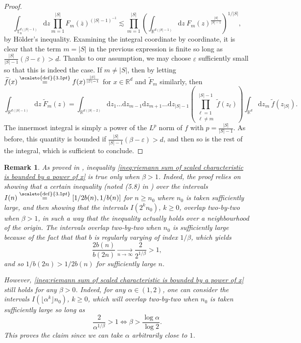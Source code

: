 \documentclass[12pt]{article}
\newcommand{\RR}{\mathbb R}
\newcommand{\TT}{\mathbb T}
\newcommand{\1}{\mathds{1}}
\renewcommand{\d}{\mathrm d}
\newcommand{\eqdef}{\stackrel{\scaleto{\mathrm{def}}{3.5pt}}{=}}
\newtheorem*{remark}{Remark}
\numberwithin{equation}{section}
\begin{document}
\begin{proof}
    \begin{equation*}
        \int_{\TT_n^{d(|S|-1)}}\d z\prod_{m=1}^{|S|}F_m(\overline z)^{(|S|-1)^{-1}}\lesssim \prod_{m=1}^{|S|}\left(\int_{\RR^{d(|S|-1)}}\d z \ F_m(z)^{\frac{|S|}{|S|-1}}\right)^{1/|S|},
    \end{equation*}
    by Hölder's inequality.
    Examining the integral coordinate by coordinate, it is clear that the term $m=|S|$ in the previous expression is finite so long as $\frac{|S|}{|S|-1}(\beta-\varepsilon)>d$. Thanks to our assumption, we may choose $\varepsilon$ sufficiently small so that this is indeed the case. If $m\ne|S|$, then by letting $\widetilde f(x)\eqdef f(x)^{\frac{|S|}{|S|-1}}$ for $x\in\RR^d$ and $\widetilde F_m$ similarly, then
    \begin{equation*}
        \int_{\RR^{d(|S|-1)}}\d z\ \widetilde F_m(z)=\int_{\RR^{d(|S|-2)}}\d z_1\dots\d z_{m-1}\d z_{m+1}\dots\d z_{|S|-1}\left(\prod_{\substack{\ell=1 \\ \ell\ne m}}^{|S|-1}\widetilde f(z_\ell)\right)\int_{\RR^d}\d z_m\ \widetilde f(z_{|S|}).
    \end{equation*}
    The innermost integral is simply a power of the $L^p$ norm of $f$ with $p=\frac{|S|}{|S|-1}$. As before, this quantity is bounded if $\frac{|S|}{|S|-1}(\beta-\varepsilon)>d$, and then so is the rest of the integral, which is sufficient to conclude.
\end{proof}

\begin{remark}
    As proved in \cite{RosenRandomWalks&IntersectionLocalTimes1990}, inequality \eqref{ineq:riemann sum of scaled characteristic is bounded by a power of x} is true only when $\beta>1$. Indeed, the proof relies on showing that a certain inequality (noted (5.8) in \cite{RosenRandomWalks&IntersectionLocalTimes1990}) over the intervals $I(n)\eqdef[1/2b(n),1/b(n)]$ for $n\ge n_0$ where $n_0$ is taken sufficiently large, and then showing that the intervals $I(2^kn_0)$, $k\ge0$, overlap two-by-two when $\beta>1$, in such a way that the inequality actually holds over a neighbourhood of the origin. The intervals overlap two-by-two when $n_0$ is sufficiently large because of the fact that that $b$ is regularly varying of index $1/\beta$, which yields
    \begin{equation*}
        \frac{2b(n)}{b(2n)}\underset{n\rightarrow\infty}\longrightarrow \frac{2}{2^{1/\beta}}>1,
    \end{equation*}
    and so $1/b(2n)>1/2b(n)$ for sufficiently large $n$.

    However, \eqref{ineq:riemann sum of scaled characteristic is bounded by a power of x} still holds for any $\beta>0$. Indeed, for any $\alpha\in(1,2)$, one can consider the intervals $I(\lfloor\alpha^k\rfloor n_0)$, $k\ge0$, which will overlap two-by-two when $n_0$ is taken sufficiently large so long as 
    \begin{equation*}
        \frac{2}{\alpha^{1/\beta}}>1\iff \beta>\frac{\log\alpha}{\log 2}.
    \end{equation*}
    This proves the claim since we can take $\alpha$ arbitrarily close to $1$.
\end{remark}
\end{document}
